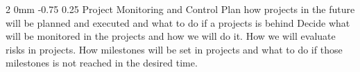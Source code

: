 \documentclass[a4paper,11pt]{article}
\makeatletter
\renewcommand{\subsection}{\@startsection
   {subsection}%
   {2}%
   {0mm}%
   {-0.75\baselineskip}%
   {0.25\baselineskip}%
   {\rmfamily\normalfont\slshape\normalsize}}%
\makeatother
\begin{document}
 \subsection{Project Monitoring and Control}
 Plan how projects in the future will be planned and executed and what to do if a projects is behind
 Decide what will be monitored in the projects and how we will do it. How we will evaluate risks in projects. How milestones will be set in projects and what to do if those milestones is not reached in the desired time.
\end{document}
